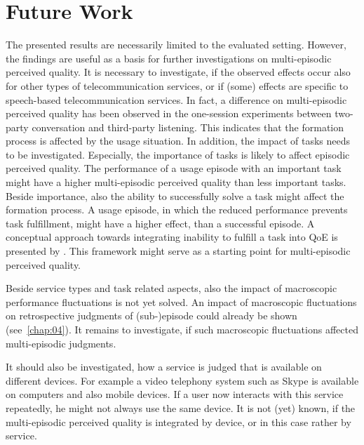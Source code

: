 \section{Future Work}
The presented results are necessarily limited to the evaluated setting.
However, the findings are useful as a basis for further investigations on multi-episodic perceived quality.
It is necessary to investigate, if the observed effects occur also for other types of telecommunication services, or if (some) effects are specific to speech-based telecommunication services.
In fact, a difference on multi-episodic perceived quality has been observed in the one-session experiments between two-party conversation and third-party listening.
This indicates that the formation process is affected by the usage situation.
In addition, the impact of tasks needs to be investigated.
Especially, the importance of tasks is likely to affect episodic perceived quality.
The performance of a usage episode with an important task might have a higher multi-episodic perceived quality than less important tasks.
Beside importance, also the ability to successfully solve a task might affect the formation process.
A usage episode, in which the reduced performance prevents task fulfillment, might have a higher effect, than a successful episode.
A conceptual approach towards integrating inability to fulfill a task into \ac{QoE} is presented by \citet{leon-garcia_generalizing_2014}.
This framework might serve as a starting point for multi-episodic perceived quality.

Beside service types and task related aspects, also the impact of macroscopic performance fluctuations is not yet solved.
An impact of macroscopic fluctuations on retrospective judgments of (sub-)episode could already be shown (see~\autoref{chap:04}).
It remains to investigate, if such macroscopic fluctuations affected multi-episodic judgments.

It should also be investigated, how a service is judged that is available on different devices.
For example a video telephony system such as Skype is available on computers and also mobile devices.
If a user now interacts with this service repeatedly, he might not always use the same device.
It is not (yet) known, if the multi-episodic perceived quality is integrated by device, or in this case rather by service.